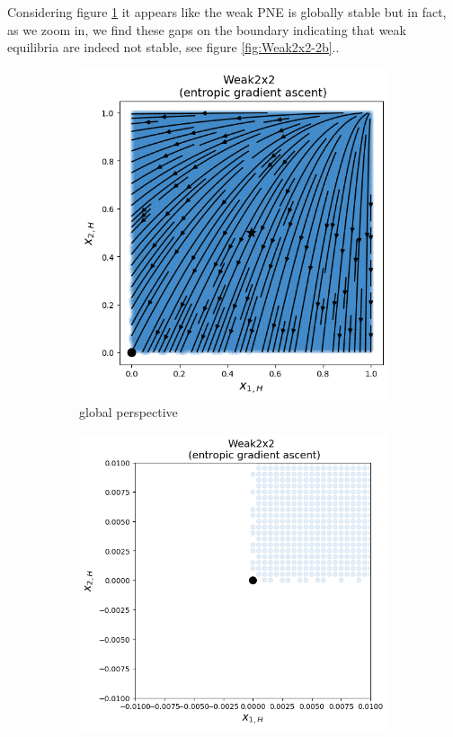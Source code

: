 Considering figure \ref{fig:Weak2x2-2a} it appears like the weak PNE is globally stable but in fact, as we zoom in, we find these gaps on the boundary indicating that weak equilibria are indeed not stable, see figure \ref{fig:Weak2x2-2b}.. 

\begin{figure}[H]
\captionsetup{justification=centering}
\centering
\begin{subfigure}{.5\textwidth}
    \centering
    \includegraphics[width=\textwidth]{logos/Weak2x2-3.png}
    \caption{global perspective}
    \label{fig:Weak2x2-2a}
\end{subfigure}%
\begin{subfigure}{.5\textwidth}
    \centering
    \includegraphics[width=\textwidth]{logos/Weak2x2-6.png}

\end{subfigure}
\end{figure}
